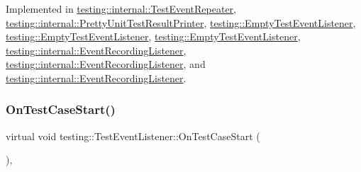 Implemented in \mbox{\hyperlink{classtesting_1_1internal_1_1_test_event_repeater_a70124c738caa338bcd723eb2a51c8b3e}{testing\+::internal\+::\+Test\+Event\+Repeater}}, \mbox{\hyperlink{classtesting_1_1internal_1_1_pretty_unit_test_result_printer_adcb68c729565d4bcdf8418a52902c3de}{testing\+::internal\+::\+Pretty\+Unit\+Test\+Result\+Printer}}, \mbox{\hyperlink{classtesting_1_1_empty_test_event_listener_a7f9a84967fde01000b7a56e9e84b6052}{testing\+::\+Empty\+Test\+Event\+Listener}}, \mbox{\hyperlink{classtesting_1_1_empty_test_event_listener_a7f9a84967fde01000b7a56e9e84b6052}{testing\+::\+Empty\+Test\+Event\+Listener}}, \mbox{\hyperlink{classtesting_1_1_empty_test_event_listener_ae4707ed9cc7ace5241bc8ccc4051209b}{testing\+::\+Empty\+Test\+Event\+Listener}}, \mbox{\hyperlink{classtesting_1_1internal_1_1_event_recording_listener_a3ce90fda790857eb64444038a5b3258f}{testing\+::internal\+::\+Event\+Recording\+Listener}}, \mbox{\hyperlink{classtesting_1_1internal_1_1_event_recording_listener_a3ce90fda790857eb64444038a5b3258f}{testing\+::internal\+::\+Event\+Recording\+Listener}}, and \mbox{\hyperlink{classtesting_1_1internal_1_1_event_recording_listener_a18c28e1d1c3a1e74e225966456786f8e}{testing\+::internal\+::\+Event\+Recording\+Listener}}.

\mbox{\label{classtesting_1_1_test_event_listener_ac48628c9f78d3e10bff77c7366e9e780}} 
\subsubsection{\texorpdfstring{OnTestCaseStart()}{OnTestCaseStart()}\hspace{0.1cm}{\footnotesize\ttfamily [2/3]}}
{\footnotesize\ttfamily virtual void testing\+::\+Test\+Event\+Listener\+::\+On\+Test\+Case\+Start (\begin{DoxyParamCaption}\item[{const \mbox{\hyperlink{classtesting_1_1_test_case}{Test\+Case}} \&}]{ }\end{DoxyParamCaption})\hspace{0.3cm}{\ttfamily [inline]}, {\ttfamily [virtual]}}



